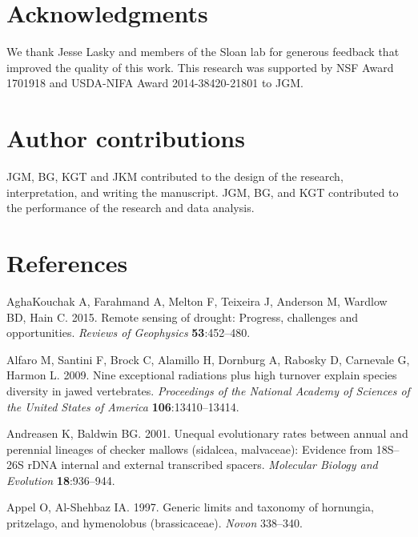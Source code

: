 \documentclass[man,floatsintext]{apa6}
\theoremstyle{definition}
\theoremstyle{definition}
\theoremstyle{definition}
\theoremstyle{remark}
\begin{document}
\hypertarget{acknowledgments}{%
\section{Acknowledgments}\label{acknowledgments}}

We thank Jesse Lasky and members of the Sloan lab for generous feedback
that improved the quality of this work. This research was supported by
NSF Award 1701918 and USDA-NIFA Award 2014-38420-21801 to JGM.

\hypertarget{author-contributions}{%
\section{Author contributions}\label{author-contributions}}

JGM, BG, KGT and JKM contributed to the design of the research,
interpretation, and writing the manuscript. JGM, BG, and KGT contributed
to the performance of the research and data analysis.

\hypertarget{references}{%
\section{References}\label{references}}

\newpage

\begingroup
\setlength{\parindent}{-0.5in}
\setlength{\leftskip}{0.5in}

\hypertarget{refs}{}
\leavevmode\hypertarget{ref-aghakouchak2015remote}{}%
AghaKouchak A, Farahmand A, Melton F, Teixeira J, Anderson M, Wardlow
BD, Hain C. 2015. Remote sensing of drought: Progress, challenges and
opportunities. \emph{Reviews of Geophysics} \textbf{53}:452--480.

\leavevmode\hypertarget{ref-R-geiger_a}{}%
Alfaro M, Santini F, Brock C, Alamillo H, Dornburg A, Rabosky D,
Carnevale G, Harmon L. 2009. Nine exceptional radiations plus high
turnover explain species diversity in jawed vertebrates.
\emph{Proceedings of the National Academy of Sciences of the United
States of America} \textbf{106}:13410--13414.

\leavevmode\hypertarget{ref-andreasen2001unequal}{}%
Andreasen K, Baldwin BG. 2001. Unequal evolutionary rates between annual
and perennial lineages of checker mallows (sidalcea, malvaceae):
Evidence from 18S--26S rDNA internal and external transcribed spacers.
\emph{Molecular Biology and Evolution} \textbf{18}:936--944.

\leavevmode\hypertarget{ref-appel1997generic}{}%
Appel O, Al-Shehbaz IA. 1997. Generic limits and taxonomy of hornungia,
pritzelago, and hymenolobus (brassicaceae). \emph{Novon} 338--340.
\end{document}

